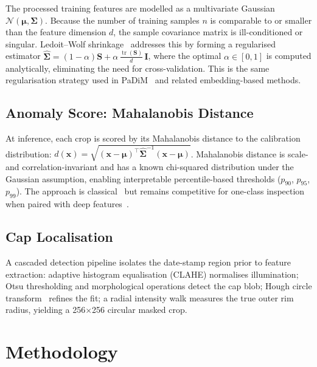 The processed training features are modelled as a multivariate Gaussian
$\mathcal{N}(\boldsymbol{\mu}, \boldsymbol{\Sigma})$.  Because the number
of training samples $n$ is comparable to or smaller than the feature
dimension $d$, the sample covariance matrix is ill-conditioned or singular.
Ledoit--Wolf shrinkage~\cite{ledoit2004well} addresses this by forming a
regularised estimator
$\hat{\boldsymbol{\Sigma}} = (1-\alpha)\mathbf{S} +
\alpha\,\frac{\operatorname{tr}(\mathbf{S})}{d}\,\mathbf{I}$,
where the optimal $\alpha\in[0,1]$ is computed analytically, eliminating
the need for cross-validation. This is the same regularisation strategy
used in PaDiM~\cite{defard2021padim} and related embedding-based methods.

\subsection{Anomaly Score: Mahalanobis Distance}

At inference, each crop is scored by its Mahalanobis distance to the
calibration distribution:
$d(\mathbf{x}) = \sqrt{(\mathbf{x}-\boldsymbol{\mu})^\top
\hat{\boldsymbol{\Sigma}}^{-1}(\mathbf{x}-\boldsymbol{\mu})}$.
Mahalanobis distance is scale- and correlation-invariant and has a known
chi-squared distribution under the Gaussian assumption, enabling
interpretable percentile-based thresholds ($p_{90}$, $p_{95}$, $p_{99}$).
The approach is classical~\cite{mahalanobis1936generalised} but remains
competitive for one-class inspection when paired with deep
features~\cite{lee2018simple,roth2022towards}.

\subsection{Cap Localisation}

A cascaded detection pipeline isolates the date-stamp region prior to
feature extraction: adaptive histogram equalisation (CLAHE) normalises
illumination; Otsu thresholding and morphological operations detect the cap
blob; Hough circle transform~\cite{ballard1981hough} refines the fit; a
radial intensity walk measures the true outer rim radius, yielding a
256$\times$256 circular masked crop.

\section{Methodology}

